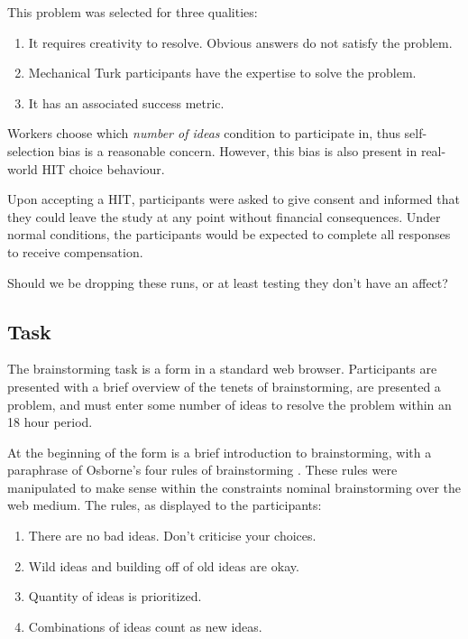 This problem was selected for three qualities:

\begin{enumerate}
\item It requires creativity to resolve. Obvious answers do not satisfy the problem.
\item Mechanical Turk participants have the expertise to solve the problem.
\item It has an associated success metric.
\end{enumerate}

Workers choose which \emph{number of ideas} condition to participate in, thus self-selection bias is a reasonable concern. However, this bias is also present in real-world HIT choice behaviour. 

Upon accepting a HIT, participants were asked to give consent and informed that they could leave the study at any point without financial consequences. Under normal conditions, the participants would be expected to complete all responses to receive compensation.

Should we be dropping these runs, or at least testing they don't have an affect?

\subsection{Task}

The brainstorming task is a form in a standard web browser. Participants are presented with a brief overview of the tenets of brainstorming, are presented a problem, and must enter some number of ideas to resolve the problem within an 18 hour period.

At the beginning of the form is a brief introduction to brainstorming, with a paraphrase of Osborne's four rules of brainstorming \cite{osborn_applied_1957}. These rules were manipulated to make sense within the constraints nominal brainstorming over the web medium. The rules, as displayed to the participants:

\begin{enumerate}
\item There are no bad ideas. Don't criticise your choices.
\item Wild ideas and building off of old ideas are okay.
\item Quantity of ideas is prioritized.
\item Combinations of ideas count as new ideas.
\end{enumerate}

